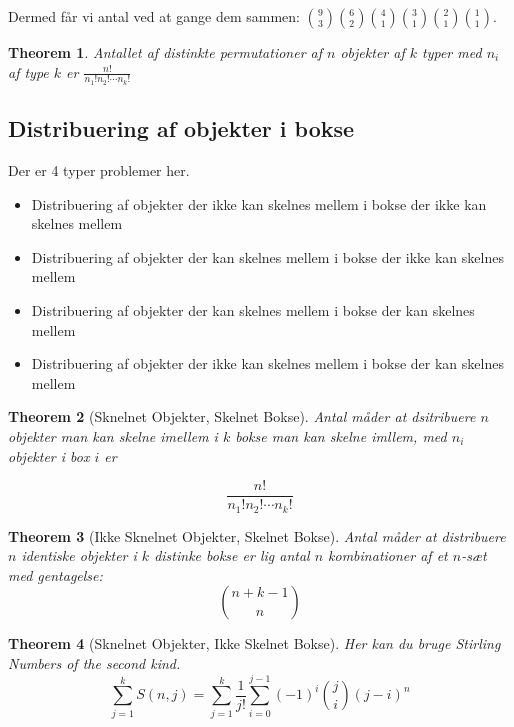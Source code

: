 \documentclass[11pt]{article}
\newtheorem{theorem}{Theorem}
\theoremstyle{definition}
\theoremstyle{remark}
\begin{document}
Dermed får vi antal ved at gange dem sammen: $\binom{9}{3} \binom{6}{2} \binom{4}{1} \binom{3}{1} \binom{2}{1} \binom{1}{1}$.

\begin{theorem}
Antallet af distinkte permutationer af $n$ objekter af $k$ typer med $n_{i}$ af type $k$ er $\frac{n!}{n_{1}!n_{2}!\cdots n_{k}!}$
\end{theorem}

\subsection{Distribuering af objekter i bokse}

Der er 4 typer problemer her.

\begin{itemize}
\item Distribuering af objekter der ikke kan skelnes mellem i bokse der ikke kan skelnes mellem
\item Distribuering af objekter der kan skelnes mellem i bokse der ikke kan skelnes mellem
\item Distribuering af objekter der kan skelnes mellem i bokse der kan skelnes mellem
\item Distribuering af objekter der ikke kan skelnes mellem i bokse der kan skelnes mellem
  \end{itemize}

\begin{theorem}[Sknelnet Objekter, Skelnet Bokse]
  Antal måder at dsitribuere $n$ objekter man kan skelne imellem i $k$ bokse man kan skelne imllem, med $n_{i}$ objekter i box $i$ er

  \[
\frac{n!}{n_{1}!n_{2}! \cdots n_{k}!}
  \]
\end{theorem}


\begin{theorem}[Ikke Sknelnet Objekter, Skelnet Bokse]
  Antal måder at distribuere $n$ identiske objekter i $k$ distinke bokse er lig antal $n$ kombinationer af et $n$-sæt med gentagelse:
  \[
\binom{n+k-1}{n}
  \]
\end{theorem}


\begin{theorem}[Sknelnet Objekter, Ikke Skelnet Bokse]
Her kan du bruge Stirling Numbers of the second kind.
\[
  \sum_{j=1}^{k}S(n,j) = \sum_{j=1}^{k}\frac{1}{j!} \sum_{i=0}^{j-1}(-1)^{i} \binom{j}{i} (j-i)^{n}
  \]

\end{theorem}
\end{document}
